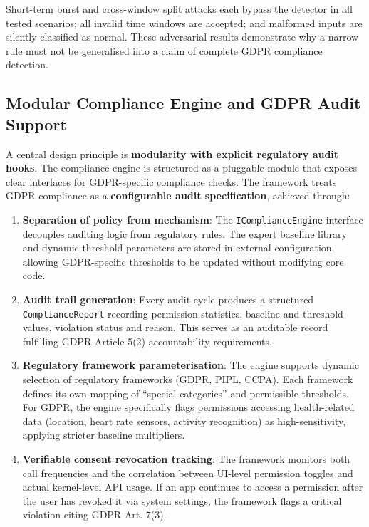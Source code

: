 Short-term burst and cross-window split attacks each bypass the detector in all tested scenarios; all invalid time windows are accepted; and malformed inputs are silently classified as normal. These adversarial results demonstrate why a narrow rule must not be generalised into a claim of complete GDPR compliance detection.

\subsection{Modular Compliance Engine and GDPR Audit Support}

A central design principle is \textbf{modularity with explicit regulatory audit hooks}. The compliance engine is structured as a pluggable module that exposes clear interfaces for GDPR-specific compliance checks. The framework treats GDPR compliance as a \textbf{configurable audit specification}, achieved through:

\begin{enumerate}
\item \textbf{Separation of policy from mechanism}: The \texttt{IComplianceEngine} interface decouples auditing logic from regulatory rules. The expert baseline library and dynamic threshold parameters are stored in external configuration, allowing GDPR-specific thresholds to be updated without modifying core code.
\item \textbf{Audit trail generation}: Every audit cycle produces a structured \texttt{ComplianceReport} recording permission statistics, baseline and threshold values, violation status and reason. This serves as an auditable record fulfilling GDPR Article 5(2) accountability requirements.
\item \textbf{Regulatory framework parameterisation}: The engine supports dynamic selection of regulatory frameworks (GDPR, PIPL, CCPA). Each framework defines its own mapping of ``special categories'' and permissible thresholds. For GDPR, the engine specifically flags permissions accessing health-related data (location, heart rate sensors, activity recognition) as high-sensitivity, applying stricter baseline multipliers.
\item \textbf{Verifiable consent revocation tracking}: The framework monitors both call frequencies and the correlation between UI-level permission toggles and actual kernel-level API usage. If an app continues to access a permission after the user has revoked it via system settings, the framework flags a critical violation citing GDPR Art. 7(3).
\end{enumerate}

